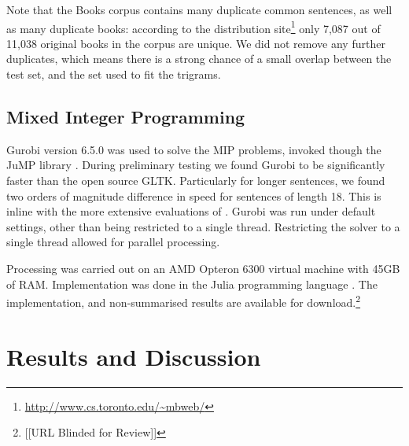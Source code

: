 \documentclass[11pt]{article}
\theoremstyle{plain}
\theoremstyle{definition}
\newcommand{\parencite}{\protect\cite}
\newcommand{\textcite}{\protect\newcite}
\newcommand{\twosteptitle}{Sel.~BOW+Ord.}
\begin{document}
Note that the Books corpus contains many duplicate common sentences, as well as many duplicate books: according to the distribution site\footnote{\url{http://www.cs.toronto.edu/~mbweb/}} only 7,087 out of 11,038 original books in the corpus are unique. We did not remove any further duplicates, which means there is a strong chance of a small overlap between the test set, and the set used to fit the trigrams.
 

\subsection{Mixed Integer Programming}
Gurobi version 6.5.0 was used to solve the MIP problems, invoked though the JuMP library \parencite{jump}. During preliminary testing we found Gurobi to be significantly faster than the open source GLTK. Particularly for longer sentences, we found two orders of magnitude difference in speed for sentences of length 18. This is inline with the more extensive evaluations of \textcite{meindl2012analysis}. Gurobi was run under default settings, other than being restricted to a single thread. Restricting the solver to a single thread allowed for parallel processing.

Processing was carried out on an AMD Opteron 6300 virtual machine with 45GB of RAM. Implementation was done in the Julia programming language \parencite{Julia}. The implementation, and non-summarised results are available for download.\footnote{[[URL Blinded for Review]]}



\section{Results and Discussion} \label{results}




\begin{table}[t]
	\centering
	\caption{The overall performance of the \twosteptitle{} sentence generation process when evaluated on the Books corpus. }
	\label{table:overall}
\end{table}
\end{document}
